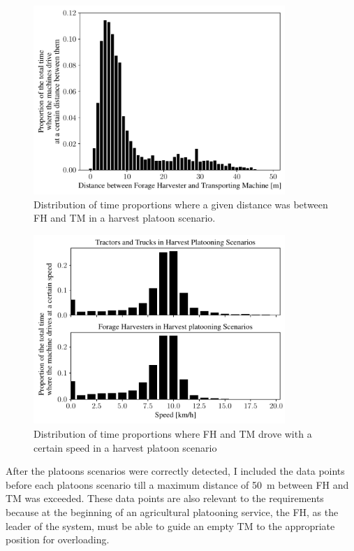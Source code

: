 \documentclass[]{nsm-thesis}
\begin{document}
\begin{figure}%
	\centering
	\includegraphics[width=0.85\textwidth]{figures/distanceHarvestSzenario.pdf}
	\caption{Distribution of time proportions where a given distance was between \ac{FH} and \ac{TM} in a harvest platoon scenario.}%
	\label{fig:distance}%
\end{figure}
\begin{figure}%
	\centering
	\includegraphics[width=0.85\textwidth]{figures/speedHarvestSzenario.pdf}
	\caption{Distribution of time proportions where \ac{FH} and \ac{TM} drove with a certain speed in a harvest platoon scenario}%
	\label{fig:speed}%
\end{figure}

After the platoons scenarios were correctly detected, I included the data points before each platoons scenario till a maximum distance of \SI{50}{\metre} between \ac{FH} and \ac{TM} was exceeded. These data points are also relevant to the requirements because at the beginning of an agricultural platooning service, the \ac{FH}, as the leader of the system, must be able to guide an empty \ac{TM} to the appropriate position for overloading.
\end{document}
